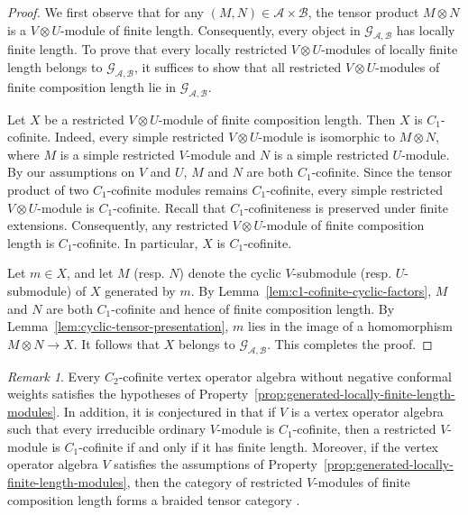 \documentclass[12pt, english]{article}
\numberwithin{equation}{section}
\theoremstyle{plain}
\theoremstyle{definition}
\theoremstyle{remark}
\newtheorem{remark}[lemma]{Remark}
\begin{document}
	\begin{proof}
		
		We first observe that for any $(M, N) \in \mathcal{A}\times\mathcal{B}$, the tensor product $M\otimes N$ is a $V\otimes U$-module of finite length.
		Consequently, every object in $ \mathcal{G}_{\mathcal{A}, \mathcal{B}}$ has locally finite length.
		To prove that every locally restricted $V\otimes U$-modules of locally finite length belongs to $ \mathcal{G}_{\mathcal{A}, \mathcal{B}}$,
		it suffices to show that all restricted $V\otimes U$-modules of finite composition length lie in $ \mathcal{G}_{\mathcal{A}, \mathcal{B}}$.
		
		Let $X$ be a restricted $V\otimes U$-module of finite composition length.
		Then $X$ is $C_1$-cofinite. Indeed, every simple restricted $V\otimes U$-module is isomorphic to $M\otimes N$, where $M$ is a simple restricted $V$-module and $N$ is a simple restricted $U$-module\cite{FHL93}. By our assumptions on $V$ and $U$, $M$ and $N$ are both $C_1$-cofinite. Since the tensor product of two $C_1$-cofinite modules remains $C_1$-cofinite, every simple restricted $V\otimes U$-module is $C_1$-cofinite. Recall that $C_1$-cofiniteness is preserved under finite extensions. Consequently, any restricted $V\otimes U$-module of finite composition length is $C_1$-cofinite. In particular, $X$ is $C_1$-cofinite.
		
		Let $m \in X$, and let $M$ (resp. $N$) denote the cyclic $V$-submodule (resp. $U$-submodule) of $X$ generated by $m$.
		By Lemma~\ref{lem:c1-cofinite-cyclic-factors}, $M$ and $N$ are both $C_1$-cofinite and hence of finite composition length.
		By Lemma~\ref{lem:cyclic-tensor-presentation},
		$m$ lies in the image of a homomorphism $M\otimes N \to X$. It follows that $X$ belongs to $\mathcal{G}_{\mathcal{A}, \mathcal{B}}$. This completes the proof.
		
	\end{proof}
	
	\begin{remark}
		Every $C_2$-cofinite vertex operator algebra without negative conformal weights satisfies the hypotheses of
		Property~\ref{prop:generated-locally-finite-length-modules}.
		In addition, it is conjectured in \cite[Conjecture~3.3]{CY21} that
		if $V$ is a vertex operator algebra such that every irreducible ordinary $V$-module is $C_1$-cofinite,
		then a restricted $V$-module is $C_1$-cofinite if and only if it has finite length.
		Moreover, if the vertex operator algebra $V$ satisfies the assumptions of Property~\ref{prop:generated-locally-finite-length-modules},
		then the category of restricted $V$-modules of finite composition length forms a braided tensor category \cite{CMHFY26}.
		
	\end{remark}
	
\end{document}
